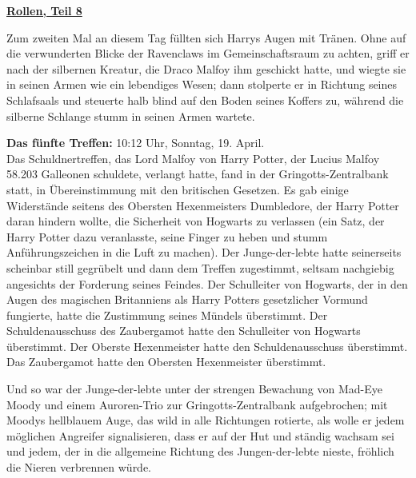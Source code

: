 

\hypertarget{rollen-teil-8}{%

\textbf{\uline{Rollen, Teil 8}}

Zum zweiten Mal an diesem Tag füllten sich Harrys Augen mit Tränen. Ohne auf die verwunderten Blicke der Ravenclaws im Gemeinschaftsraum zu achten, griff er nach der silbernen Kreatur, die Draco Malfoy ihm geschickt hatte, und wiegte sie in seinen Armen wie ein lebendiges Wesen; dann stolperte er in Richtung seines Schlafsaals und steuerte halb blind auf den Boden seines Koffers zu, während die silberne Schlange stumm in seinen Armen wartete.

\textbf{Das fünfte Treffen:} 10:12 Uhr, Sonntag, 19. April.\\ Das Schuldnertreffen, das Lord Malfoy von Harry Potter, der Lucius Malfoy 58.203 Galleonen schuldete, verlangt hatte, fand in der Gringotts-Zentralbank statt, in Übereinstimmung mit den britischen Gesetzen. Es gab einige Widerstände seitens des Obersten Hexenmeisters Dumbledore, der Harry Potter daran hindern wollte, die Sicherheit von Hogwarts zu verlassen (ein Satz, der Harry Potter dazu veranlasste, seine Finger zu heben und stumm Anführungszeichen in die Luft zu machen). Der Junge-der-lebte hatte seinerseits scheinbar still gegrübelt und dann dem Treffen zugestimmt, seltsam nachgiebig angesichts der Forderung seines Feindes. Der Schulleiter von Hogwarts, der in den Augen des magischen Britanniens als Harry Potters gesetzlicher Vormund fungierte, hatte die Zustimmung seines Mündels überstimmt. Der Schuldenausschuss des Zaubergamot hatte den Schulleiter von Hogwarts überstimmt. Der Oberste Hexenmeister hatte den Schuldenausschuss überstimmt. Das Zaubergamot hatte den Obersten Hexenmeister überstimmt.

Und so war der Junge-der-lebte unter der strengen Bewachung von Mad-Eye Moody und einem Auroren-Trio zur Gringotts-Zentralbank aufgebrochen; mit Moodys hellblauem Auge, das wild in alle Richtungen rotierte, als wolle er jedem möglichen Angreifer signalisieren, dass er auf der Hut und ständig wachsam sei und jedem, der in die allgemeine Richtung des Jungen-der-lebte nieste, fröhlich die Nieren verbrennen würde.

}
